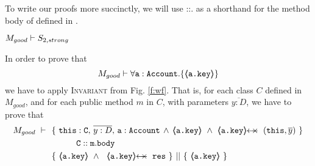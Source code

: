 { To write our proofs more succinctly, we will use ::. as a shorthand for the method body of  defined in .}

  

\begin{lemma}
\label{lemma:exampleKeyProtect}
\label{l:Mgood:S2}
$M_{good} \vdash S_{2,strong}$
\end{lemma}
\begin{proofO}
In order to prove that 
$$M_{good} \vdash \forall {\mbox{\normalfont{\texttt{a}}}:\mbox{\normalfont{\texttt{Account}}}}.{{\{}}{\langle\!\!\langle \mbox{\normalfont{\texttt{\mbox{\normalfont{\texttt{a.key}}}}}} \rangle\!\!\rangle}{{\}}}$$
we have to apply  \textsc{Invariant} from Fig. \ref{f:wf}.
 That is, for each  class $C$  defined in $M_{good}$, and for each public method $m$ in $C$, with parameters $\overline{y:D}$, we have to prove that
 \small
\begin{align*}
M_{good}\ \vdash \ \ &   \{ \ \prg{this}:\prg{C},\, \overline{y:D},\, \prg{a}:\prg{Account}\, \wedge\,
		             {\inside{\prg{a.key}}}\ \wedge\       \protectedFrom {\prg{a.key}} {(\prg{this},\overline y)} \  \} \\
		& \SPT  \prg{C}::\prg{m}.\prg{body}\  \\
		&
                   \{\ {\inside{\prg{a.key}}}\ \wedge\ \ \protectedFrom {\prg{a.key}} {\prg{res}}   \ \}\ ||\ \{\ {\inside{\prg{a.key} } } \ \} \\
\end{align*}



\end{proofO}
